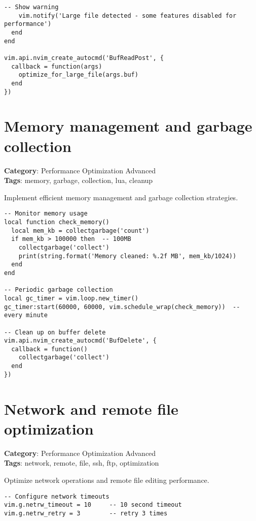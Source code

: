 {{{{{{{{{\begin{Exa*}{}
\begin{Verbatim}[fontsize=\footnotesize, breaklines, breakanywhere]
    -- Show warning
    vim.notify('Large file detected - some features disabled for performance')
  end
end

vim.api.nvim_create_autocmd('BufReadPost', {
  callback = function(args)
    optimize_for_large_file(args.buf)
  end
})
\end{Verbatim}
\end{Exa*}

\section{Memory management and garbage collection}

\textbf{Category}: Performance Optimization Advanced\\ \textbf{Tags}: memory, garbage, collection, lua, cleanup
\vspace{0.5cm}

Implement efficient memory management and garbage collection strategies.

\begin{Exa*}{}
\begin{Verbatim}[fontsize=\footnotesize, breaklines, breakanywhere]
-- Monitor memory usage
local function check_memory()
  local mem_kb = collectgarbage('count')
  if mem_kb > 100000 then  -- 100MB
    collectgarbage('collect')
    print(string.format('Memory cleaned: %.2f MB', mem_kb/1024))
  end
end

-- Periodic garbage collection
local gc_timer = vim.loop.new_timer()
gc_timer:start(60000, 60000, vim.schedule_wrap(check_memory))  -- every minute

-- Clean up on buffer delete
vim.api.nvim_create_autocmd('BufDelete', {
  callback = function()
    collectgarbage('collect')
  end
})
\end{Verbatim}
\end{Exa*}

\section{Network and remote file optimization}

\textbf{Category}: Performance Optimization Advanced\\ \textbf{Tags}: network, remote, file, ssh, ftp, optimization
\vspace{0.5cm}

Optimize network operations and remote file editing performance.

\begin{Exa*}{}
\begin{Verbatim}[fontsize=\footnotesize, breaklines, breakanywhere]
-- Configure network timeouts
vim.g.netrw_timeout = 10     -- 10 second timeout
vim.g.netrw_retry = 3        -- retry 3 times


\end{Verbatim}
\end{Exa*}}}}}}}}}}
